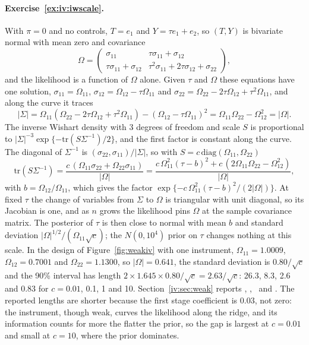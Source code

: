 \paragraph{Exercise~\ref{ex:iv:iwscale}.} With $\pi = 0$ and no controls, $T = e_1$ and $Y = \tau e_1 + e_2$, so $(T, Y)$ is bivariate normal with mean zero and covariance
\[
\Omega = \begin{pmatrix} \sigma_{11} & \tau\sigma_{11} + \sigma_{12} \\ \tau\sigma_{11} + \sigma_{12} & \tau^2\sigma_{11} + 2\tau\sigma_{12} + \sigma_{22} \end{pmatrix},
\]
and the likelihood is a function of $\Omega$ alone. Given $\tau$ and $\Omega$ these equations have one solution, $\sigma_{11} = \Omega_{11}$, $\sigma_{12} = \Omega_{12} - \tau\Omega_{11}$ and $\sigma_{22} = \Omega_{22} - 2\tau\Omega_{12} + \tau^2\Omega_{11}$, and along the curve it traces
\[
|\Sigma| = \Omega_{11}(\Omega_{22} - 2\tau\Omega_{12} + \tau^2\Omega_{11}) - (\Omega_{12} - \tau\Omega_{11})^2 = \Omega_{11}\Omega_{22} - \Omega_{12}^2 = |\Omega|.
\]
The inverse Wishart density with 3 degrees of freedom and scale $S$ is proportional to $|\Sigma|^{-3}\exp\{-\mathrm{tr}(S\Sigma^{-1})/2\}$, and the first factor is constant along the curve. The diagonal of $\Sigma^{-1}$ is $(\sigma_{22}, \sigma_{11})/|\Sigma|$, so with $S = c\,\mathrm{diag}(\Omega_{11}, \Omega_{22})$
\[
\mathrm{tr}(S\Sigma^{-1}) = \frac{c\,(\Omega_{11}\sigma_{22} + \Omega_{22}\sigma_{11})}{|\Omega|} = \frac{c\,\Omega_{11}^2(\tau - b)^2 + c\,(2\Omega_{11}\Omega_{22} - \Omega_{12}^2)}{|\Omega|},
\]
with $b = \Omega_{12}/\Omega_{11}$, which gives the factor $\exp\{-c\,\Omega_{11}^2(\tau - b)^2/(2|\Omega|)\}$. At fixed $\tau$ the change of variables from $\Sigma$ to $\Omega$ is triangular with unit diagonal, so its Jacobian is one, and as $n$ grows the likelihood pins $\Omega$ at the sample covariance matrix. The posterior of $\tau$ is then close to normal with mean $b$ and standard deviation $|\Omega|^{1/2}/(\Omega_{11}\sqrt{c})$; the $N(0, 10^4)$ prior on $\tau$ changes nothing at this scale. In the design of Figure~\ref{fig:weakiv} with one instrument, $\Omega_{11} = 1.0009$, $\Omega_{12} = 0.7001$ and $\Omega_{22} = 1.1300$, so $|\Omega| = 0.641$, the standard deviation is $0.80/\sqrt{c}$ and the 90\% interval has length $2 \times 1.645 \times 0.80/\sqrt{c} = 2.63/\sqrt{c}$: 26.3, 8.3, 2.6 and 0.83 for $c = 0.01$, 0.1, 1 and 10. Section~\ref{iv:sec:weak} reports \ivscalesmall, \ivscaledeflen, \ivscaleten\ and \ivscalehund. The reported lengths are shorter because the first stage coefficient is 0.03, not zero: the instrument, though weak, curves the likelihood along the ridge, and its information counts for more the flatter the prior, so the gap is largest at $c = 0.01$ and small at $c = 10$, where the prior dominates.

